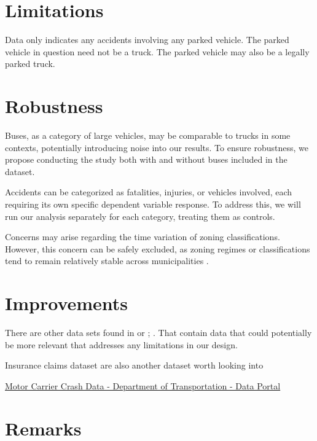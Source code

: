 \documentclass[
  12pt]{article}
\begin{document}
\section{\texorpdfstring{\textbf{Limitations}}{Limitations}}\label{limitations}

Data only indicates any accidents involving any parked vehicle. The
parked vehicle in question need not be a truck. The parked vehicle may
also be a legally parked truck.~

\section{\texorpdfstring{\textbf{Robustness}}{Robustness}}\label{robustness}

Buses, as a category of large vehicles, may be comparable to trucks in
some contexts, potentially introducing noise into our results. To ensure
robustness, we propose conducting the study both with and without buses
included in the dataset.

Accidents can be categorized as fatalities, injuries, or vehicles
involved, each requiring its own specific dependent variable response.
To address this, we will run our analysis separately for each category,
treating them as controls.

Concerns may arise regarding the time variation of zoning
classifications. However, this concern can be safely excluded, as zoning
regimes or classifications tend to remain relatively stable across
municipalities \citep{mclaughlinLandUseRegulation2012}.

\section{\texorpdfstring{\textbf{Improvements}}{Improvements}}\label{improvements}

There are other data sets found in \citep{NHTSAFileDownloads} or
\citep{FatalityAnalysisReporting} ; . That contain data that could
potentially be more relevant that addresses any limitations in our
design.

Insurance claims dataset are also another dataset worth looking into

\href{https://data.transportation.gov/Trucking-and-Motorcoaches/Motor-Carrier-Crash-Data-/b8e5-isfj/about_data}{Motor
Carrier Crash Data - \textbar{} Department of Transportation - Data
Portal}

\section{Remarks}\label{remarks}
\end{document}
